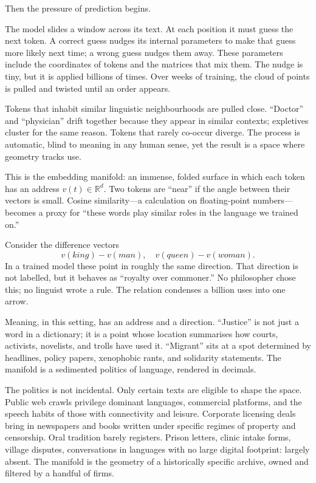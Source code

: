 \documentclass[12pt,a4paper]{article}
\begin{document}
Then the pressure of prediction begins.

The model slides a window across its text. At each position it must guess the next token. A correct guess nudges its internal parameters to make that guess more likely next time; a wrong guess nudges them away. These parameters include the coordinates of tokens and the matrices that mix them. The nudge is tiny, but it is applied billions of times. Over weeks of training, the cloud of points is pulled and twisted until an order appears.

Tokens that inhabit similar linguistic neighbourhoods are pulled close. ``Doctor'' and ``physician'' drift together because they appear in similar contexts; expletives cluster for the same reason. Tokens that rarely co-occur diverge. The process is automatic, blind to meaning in any human sense, yet the result is a space where geometry tracks use.

This is the embedding manifold: an immense, folded surface in which each token has an address $v(t) \in \mathbb{R}^d$. Two tokens are ``near'' if the angle between their vectors is small. Cosine similarity---a calculation on floating-point numbers---becomes a proxy for ``these words play similar roles in the language we trained on.''

Consider the difference vectors
\[
v(\textit{king}) - v(\textit{man}), \quad v(\textit{queen}) - v(\textit{woman}).
\]
In a trained model these point in roughly the same direction. That direction is not labelled, but it behaves as ``royalty over commoner.'' No philosopher chose this; no linguist wrote a rule. The relation condenses a billion uses into one arrow.

Meaning, in this setting, has an address and a direction. ``Justice'' is not just a word in a dictionary; it is a point whose location summarises how courts, activists, novelists, and trolls have used it. ``Migrant'' sits at a spot determined by headlines, policy papers, xenophobic rants, and solidarity statements. The manifold is a sedimented politics of language, rendered in decimals.

The politics is not incidental. Only certain texts are eligible to shape the space. Public web crawls privilege dominant languages, commercial platforms, and the speech habits of those with connectivity and leisure. Corporate licensing deals bring in newspapers and books written under specific regimes of property and censorship. Oral tradition barely registers. Prison letters, clinic intake forms, village disputes, conversations in languages with no large digital footprint: largely absent. The manifold is the geometry of a historically specific archive, owned and filtered by a handful of firms.
\end{document}
